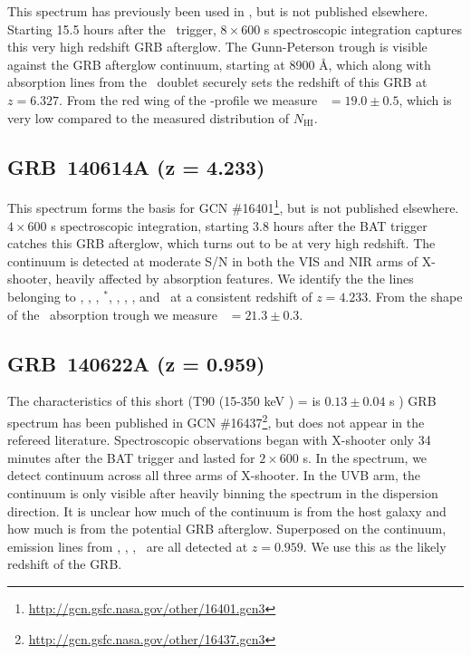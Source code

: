 \documentclass{aa}    %
\begin{document}
This spectrum has previously been used in \citet{Melandri2015}, but is not
published elsewhere. Starting 15.5 hours after the \swift~trigger, $8\times600$
s spectroscopic integration captures this very high redshift GRB afterglow. The
Gunn-Peterson trough is visible against the GRB afterglow continuum, starting at
8900 \AA, which along with absorption lines from the \mgii~doublet securely sets
the redshift of this GRB at $z = 6.327$. From the red wing of the \lya-profile
we measure \nh~$=19.0 \pm 0.5$, which is very low compared to the measured
distribution of $N_{\mathrm{HI}}$.

\subsection{GRB~140614A (z = 4.233)}	

This spectrum forms the basis for GCN
\#16401\footnote{\url{http://gcn.gsfc.nasa.gov/other/16401.gcn3}}, but is not
published elsewhere. $4\times600$ s spectroscopic integration, starting 3.8
hours after the BAT trigger catches this GRB afterglow, which turns out to be at
very high redshift. The continuum is detected at moderate S/N in both the VIS
and NIR arms of X-shooter, heavily affected by absorption features. We identify
the the lines belonging to \lya, \SIii, \cii, \cii$^*$, \alii, \aliii, \feii,
and \mgii~at a consistent redshift of $z = 4.233$. From the shape of the
\lya~absorption trough we measure \nh~$=21.3 \pm 0.3$.

\subsection{GRB~140622A (z = 0.959)}	

The characteristics of this short (T90 (15-350 keV ) = is $0.13 \pm 0.04$ s
\citep{Lien2016}) GRB spectrum has been published in GCN
\#16437\footnote{\url{http://gcn.gsfc.nasa.gov/other/16437.gcn3}}, but does not
appear in the refereed literature. Spectroscopic observations began with
X-shooter only 34 minutes after the BAT trigger and lasted for $2\times600$ s.
In the spectrum, we detect continuum across all three arms of X-shooter. In the
UVB arm, the continuum is only visible after heavily binning the spectrum in the
dispersion direction. It is unclear how much of the continuum is from the host
galaxy and how much is from the potential GRB afterglow. Superposed on the
continuum, emission lines from \oii, \hb, \oiii, \ha~are all detected at $z =
0.959$. We use this as the likely redshift of the GRB.
\end{document}
